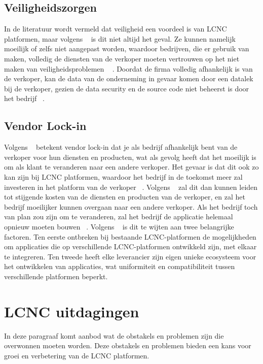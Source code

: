 \subsection*{Veiligheidszorgen}
\label{subsec:veiligheidszorgen}
In de literatuur wordt vermeld dat veiligheid een voordeel is van LCNC platformen, maar volgens ~\textcite{Yan2021} is dit niet altijd het geval. 
Ze kunnen namelijk moeilijk of zelfs niet aangepast worden, waardoor bedrijven, die er gebruik van maken, volledig de diensten van de verkoper 
moeten vertrouwen op het niet maken van veiligheidsproblemen ~\autocite{Yan2021} \autocite{Rokis_2022}. 
Doordat de firma volledig afhankelijk is van de verkoper, kan de data van de onderneming in gevaar komen door een datalek bij de verkoper, gezien 
de data security en de source code niet beheerst is door het bedrijf ~\autocite{Yan2021}.

\subsection*{Vendor Lock-in}
\label{subsec:technische-schulden}
Volgens ~\textcite{Yan2021} betekent vendor lock-in dat je als bedrijf afhankelijk bent van de verkoper voor hun diensten en producten, 
wat als gevolg heeft dat het moeilijk is om als klant te veranderen naar een andere verkoper. Het gevaar is dat dit ook zo kan zijn bij LCNC platformen, 
waardoor het bedrijf in de toekomst meer zal investeren in het platform van de verkoper ~\autocite{Yan2021}. 
Volgens ~\textcite{Yan2021} zal dit dan kunnen leiden tot stijgende kosten van de diensten en producten van de verkoper, 
en zal het bedrijf moeilijker kunnen overgaan naar een andere verkoper. Als het bedrijf toch van plan zou zijn om te veranderen, 
zal het bedrijf de applicatie helemaal opnieuw moeten bouwen ~\autocite{Sufi_2023}.  
Volgens ~\textcite{Sufi_2023} is dit te wijten aan twee belangrijke factoren. 
Ten eerste ontbreken bij bestaande LCNC-platformen de mogelijkheden om applicaties die op verschillende LCNC-platformen ontwikkeld zijn, met elkaar te integreren.
Ten tweede heeft elke leverancier zijn eigen unieke ecosysteem voor het ontwikkelen van applicaties, wat uniformiteit en compatibiliteit tussen verschillende platformen beperkt.


\section{LCNC uitdagingen}
\label{sec:lcnc-uitdagingen}
In deze paragraaf komt aanbod wat de obstakels en problemen zijn die overwonnen moeten worden. Deze obstakels en problemen bieden een kans voor groei en
verbetering van de LCNC platformen.
